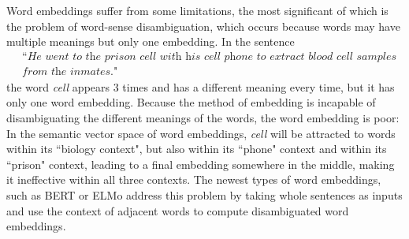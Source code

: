         Word \glspl{embedding} suffer from some limitations, the most significant of which is the problem of word-sense disambiguation, which occurs because words may have multiple meanings but only one \gls{embedding}. In the sentence
        \begin{align*}
            &\textit{``He went to the prison cell with his cell phone to extract blood cell samples}\\
            & \textit{from the inmates."}
        \end{align*}
        the word \textit{cell} appears 3 times and has a different meaning every time, but it has only one word \gls{embedding}. Because the method of \gls{embedding} is incapable of disambiguating the different meanings of the words, the word \gls{embedding} is poor: In the semantic vector space of word \glspl{embedding}, \textit{cell} will be attracted to words within its ``biology context", but also within its ``phone" context and within its ``prison" context, leading to a final \gls{embedding} somewhere in the middle, making it ineffective within all three contexts. The newest types of word \glspl{embedding}, such as BERT\cite{devlin2018bert} or ELMo\cite{peters2018elmo} address this problem by taking whole sentences as inputs and use the context of adjacent words to compute disambiguated word \glspl{embedding}.
